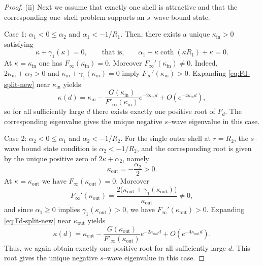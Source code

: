 \documentclass[a4paper,11pt]{article}
\numberwithin{equation}{section}
\theoremstyle{definition}
\theoremstyle{remark}
\begin{document}
\begin{proof}
\smallskip
\noindent
(ii) Next we assume that exactly one shell is attractive and that the
corresponding one--shell problem supports an $s$--wave bound state.

\smallskip
\noindent
Case 1: $\alpha_1<0\le\alpha_2$ and $\alpha_1<-1/R_1$.
Then, there exists a unique $\kappa_{\mathrm{in}}>0$ satisfying
$$
\kappa+\gamma_1(\kappa)=0,
\qquad\text{that is,}\qquad
\alpha_1+\kappa\coth(\kappa R_1)+\kappa=0.
$$
At $\kappa=\kappa_{\mathrm{in}}$ one has $F_\infty(\kappa_{\mathrm{in}})=0$.
Moreover $F_\infty'(\kappa_{\mathrm{in}})\ne0$.
Indeed, $2\kappa_{\mathrm{in}}+\alpha_2>0$ and
$\kappa_{\mathrm{in}}+\gamma_1(\kappa_{\mathrm{in}})=0$ imply
$F_\infty'(\kappa_{\mathrm{in}})>0$.
Expanding \eqref{eq:Fd-split-new} near $\kappa_{\mathrm{in}}$ yields
$$
\kappa(d)=\kappa_{\mathrm{in}}
-\frac{G(\kappa_{\mathrm{in}})}{F'_\infty(\kappa_{\mathrm{in}})}e^{-2\kappa_{\mathrm{in}}d}
+O(e^{-4\kappa_{\mathrm{in}}d}),
$$
so for all sufficiently large $d$ there exists exactly one positive root of
$F_d$.
The corresponding eigenvalue gives the unique negative $s$--wave eigenvalue in
this case.

\smallskip
\noindent
Case 2: $\alpha_2<0\le\alpha_1$ and $\alpha_2<-1/R_2$.
For the single outer shell at $r=R_2$, the $s$--wave bound state condition is
$\alpha_2<-1/R_2$, and the corresponding root is given by the unique positive
zero of $2\kappa+\alpha_2$, namely
$$
\kappa_{\mathrm{out}}=-\frac{\alpha_2}{2}>0.
$$
At $\kappa=\kappa_{\mathrm{out}}$ we have $F_\infty(\kappa_{\mathrm{out}})=0$.
Moreover
$$
F_\infty'(\kappa_{\mathrm{out}})
=\frac{2\bigl(\kappa_{\mathrm{out}}+\gamma_1(\kappa_{\mathrm{out}})\bigr)}{\kappa_{\mathrm{out}}}
\ne0,
$$
and since $\alpha_1\ge0$ implies $\gamma_1(\kappa_{\mathrm{out}})>0$, we have
$F_\infty'(\kappa_{\mathrm{out}})>0$.
Expanding \eqref{eq:Fd-split-new} near $\kappa_{\mathrm{out}}$ yields
$$
\kappa(d)=\kappa_{\mathrm{out}}
-\frac{G(\kappa_{\mathrm{out}})}{F'_\infty(\kappa_{\mathrm{out}})}e^{-2\kappa_{\mathrm{out}}d}
+O(e^{-4\kappa_{\mathrm{out}}d}).
$$
Thus, we again obtain exactly one positive root for all sufficiently large $d$.
This root gives the unique negative $s$--wave eigenvalue in this case.


\end{proof}
\end{document}
